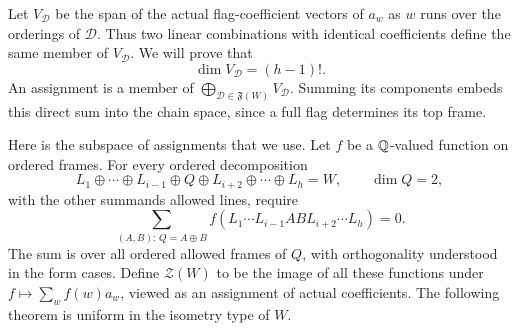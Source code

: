 Let $V_{\mathcal D}$ be the span of the actual flag-coefficient vectors of
$a_w$ as $w$ runs over the orderings of $\mathcal D$.  Thus two linear
combinations with identical coefficients define the same member of
$V_{\mathcal D}$.  We will prove that
\begin{equation}\label{eq:local-frame-dimension}
 \dim V_{\mathcal D}=(h-1)!.
\end{equation}
An assignment is a member of $\bigoplus_{\mathcal D\in\mathfrak F(W)}
V_{\mathcal D}$.  Summing its components embeds this direct sum into the
chain space, since a full flag determines its top frame.

Here is the subspace of assignments that we use.  Let $f$ be a
$\mathbb Q$-valued function on ordered frames.  For every ordered decomposition
\[
 L_1\oplus\cdots\oplus L_{i-1}\oplus Q\oplus
 L_{i+2}\oplus\cdots\oplus L_h=W,
 \qquad \dim Q=2,
\]
with the other summands allowed lines, require
\begin{equation}\label{eq:frame-plane-relation}
 \sum_{(A,B):\,Q=A\oplus B}
 f(L_1\cdots L_{i-1}AB L_{i+2}\cdots L_h)=0.
\end{equation}
The sum is over all ordered allowed frames of $Q$, with orthogonality
understood in the form cases.  Define $\mathcal Z(W)$ to be the image of
all these functions under $f\mapsto\sum_w f(w)a_w$, viewed as an assignment
of actual coefficients.  The following theorem is uniform in the
isometry type of $W$.

